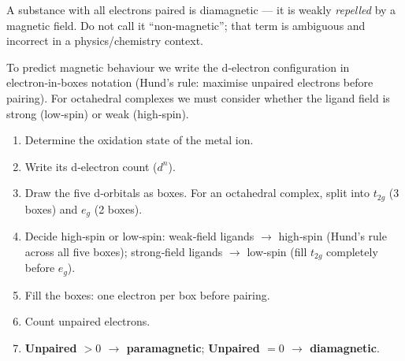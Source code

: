\documentclass[11pt]{article}
\newcommand{\cle}[1]{{\popxbold\color{popdark}#1}}
\begin{document}
\begin{attention}
A substance with all electrons paired is \cle{diamagnetic} — it is weakly \emph{repelled} by a magnetic field. Do not call it “non‑magnetic”; that term is ambiguous and incorrect in a physics/chemistry context.
\end{attention}

To predict magnetic behaviour we write the d‑electron configuration in \cle{electron‑in‑boxes} notation (Hund’s rule: maximise unpaired electrons before pairing). For octahedral complexes we must consider whether the ligand field is strong (low‑spin) or weak (high‑spin).

\begin{methode}
\begin{enumerate}
\item Determine the oxidation state of the metal ion.
\item Write its d‑electron count ($d^n$).
\item Draw the five d‑orbitals as boxes. For an octahedral complex, split into $t_{2g}$ (3 boxes) and $e_g$ (2 boxes).
\item Decide high‑spin or low‑spin: weak‑field ligands $\rightarrow$ high‑spin (Hund’s rule across all five boxes); strong‑field ligands $\rightarrow$ low‑spin (fill $t_{2g}$ completely before $e_g$).
\item Fill the boxes: one electron per box before pairing.
\item Count unpaired electrons.
\item \textbf{Unpaired $>0$ $\rightarrow$ paramagnetic}; \textbf{Unpaired $=0$ $\rightarrow$ diamagnetic}.
\end{enumerate}
\end{methode}
\end{document}
